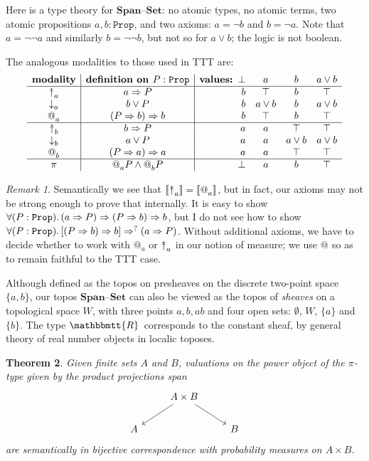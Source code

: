 \documentclass[11pt, oneside, article]{memoir}
\makeatletter
\theoremstyle{plain}
\newtheorem{theorem}{Theorem}[chapter] %
\theoremstyle{definition}
\theoremstyle{remark}
\newtheorem{remark}[theorem]{Remark}
\DeclarePairedDelimiter{\church}{\llbracket}{\rrbracket}
\newcommand{\const}[1]{\mathtt{#1}}
\newcommand{\Cat}[1]{\mathbf{#1}}
\newcommand{\smset}{\Cat{Set}}
\newcommand{\internal}[1]{\raisebox{-.03ex}{$\mathbbmtt{#1}$}}
\newcommand{\hs}{\hspace{1.1pt}}
\newcommand{\tRR}{\internal{R}\hs}
\newcommand{\Prop}{\const{Prop}}
\newcommand{\AtSymbol}{{@}}
\newcommand{\SeeSymbol}{{\down}}  %
\newcommand{\InSymbol}{{\upclose}}%
\newcommand{\At}[2][]{\AtSymbol^{#1}_{#2}}
\newcommand{\See}[2][]{\SeeSymbol^{#1}_{#2}}
\newcommand{\In}[2][]{\InSymbol^{#1}_{#2}}
\newcommand{\upclose}{{\rotatebox[origin=c]{90}{$\twoheadrightarrow$}}}
\newcommand{\down}{\mathord{\downarrow}}
\newcommand{\imp}{\Rightarrow}
\newcommand{\Span}{\Cat{Span}}
\newcommand{\set}{\text{--}\smset}
\makeatother
\begin{document}
Here is a type theory for $\Span\set$: no atomic types, no atomic terms, two atomic propositions $a,b:\Prop$, and two axioms: $a=\neg b$ and $b=\neg a$. Note that $a=\neg\neg a$ and similarly $b=\neg\neg b$, but not so for $a\vee b$; the logic is not boolean.

The analogous modalities to those used in TTT are:
\[
\begin{array}{c|c|rccc}
	\textbf{modality}&\textbf{definition on } P:\Prop&\textbf{values: }\bot&a&b&a\vee b \\\hline
	\In{a}&a\imp P&b&\top&b&\top\\
	\See{a}&b\vee P&b&a\vee b&b&a\vee b\\
	\At{a}&(P\imp b)\imp b&b&\top&b&\top\\\hline
	\In{b}&b\imp P&a&a&\top&\top\\
	\See{b}&a\vee P&a&a&a\vee b&a\vee b\\
	\At{b}&(P\imp a)\imp a&a&a&\top&\top\\\hline
	\pi&\At{a}P\wedge\At{b}P&\bot&a&b&\top
\end{array}
\]

\begin{remark}
Semantically we see that $\church{\In{a}}=\church{\At{a}}$, but in fact, our axioms may not be strong enough to prove that internally. It is easy to show $\forall(P:\Prop)\ldotp(a\imp P)\imp(P\imp b)\imp b$, but I do not see how to show $\forall(P:\Prop)\ldotp[(P\imp b)\imp b]\imp^? (a\imp P)$. Without additional axioms, we have to decide whether to work with $\At{a}$ or $\In{a}$ in our notion of measure; we use $\At{}$ so as to remain faithful to the TTT case. 
\end{remark}

Although defined as the topos on presheaves on the discrete two-point space $\{a,b\}$, our topos $\Span\set$ can also be viewed as the topos of \emph{sheaves} on a topological space $W$, with three points $a,b,ab$ and four open sets: $\emptyset$, $W$, $\{a\}$ and $\{b\}$. The type $\tRR$ corresponds to the constant sheaf, by general theory of real number objects in localic toposes.

\begin{theorem}
Given finite sets $A$ and $B$, valuations on the power object of the $\pi$-type given by the product projections span
\[\begin{tikzcd}
	& A \times B \ar{dl} \ar{dr} \\
	A & & B
\end{tikzcd}\]
are semantically in bijective correspondence with probability measures on $A\times B$.
\end{theorem}
\end{document}
